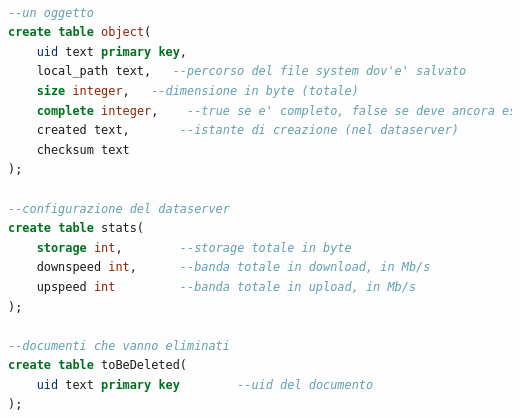 \documentclass[11pt,a4paper,english]{article}
\begin{document}
\begin{lstlisting}[language=SQL, title=Struttura]

--un oggetto
create table object(
    uid text primary key,
    local_path text,   --percorso del file system dov'e' salvato
    size integer,   --dimensione in byte (totale)
    complete integer,    --true se e' completo, false se deve ancora essere totalmente trasferito
    created text,       --istante di creazione (nel dataserver)
    checksum text
);

--configurazione del dataserver
create table stats(
    storage int,        --storage totale in byte
    downspeed int,      --banda totale in download, in Mb/s
    upspeed int         --banda totale in upload, in Mb/s 
);

--documenti che vanno eliminati
create table toBeDeleted(
    uid text primary key        --uid del documento
);


\end{lstlisting}
\end{document}
